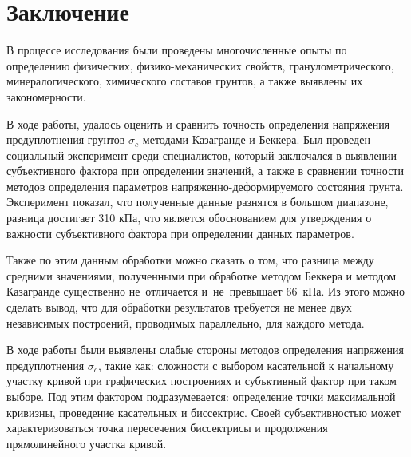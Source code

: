 \chapter*{Заключение}                       %


В процессе исследования были проведены многочисленные опыты по определению физических, физико-механических свойств, гранулометрического, минералогического, химического составов грунтов, а также выявлены их закономерности. 

В ходе работы, удалось оценить и сравнить точность определения напряжения предуплотнения грунтов $\sigma_c$ методами Казагранде и Беккера. Был проведен социальный эксперимент среди специалистов, который заключался в выявлении субъективного фактора при определении значений, а также в сравнении точности методов определения параметров напряженно-деформируемого состояния грунта. Эксперимент показал, что полученные данные разнятся в большом диапазоне, разница достигает 310 кПа, что является обоснованием для утверждения о важности субъективного фактора при определении данных параметров.

Также по этим данным обработки можно сказать о том, что разница между средними значениями, полученными при обработке методом Беккера и методом Казагранде существенно не~отличается и~не~превышает 66~кПа. Из этого можно сделать вывод, что для обработки результатов требуется не менее двух независимых построений, проводимых параллельно, для каждого метода.

В ходе работы были выявлены слабые стороны методов определения напряжения предуплотнения $\sigma_c$, такие как: сложности с выбором касательной к начальному участку кривой при графических построениях и субъктивный фактор при таком выборе. Под этим фактором подразумевается: определение точки максимальной кривизны, проведение касательных и биссектрис. Своей субъективностью может характеризоваться точка пересечения биссектрисы и продолжения прямолинейного участка кривой.


